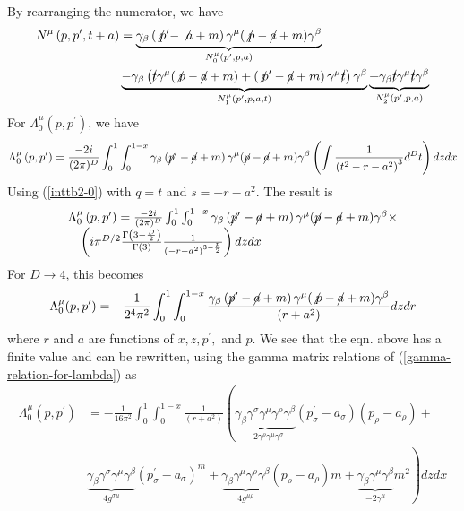 By rearranging the numerator, we have
$$
\begin{aligned}
N^{\mu}\left(p, p^{\prime}, t+a\right) &=\underbrace{\gamma_{\beta}\left(\not p^{\prime}-\not a+m\right) \gamma^{\mu}(\not p-\cancel{a}+m) \gamma^{\beta}}_{N_{0}^{\mu}\left(p^{\prime}, p, a\right)}\\
&\underbrace{-\gamma_{\beta}\left(\cancel{t} \gamma^{\mu}(\not p-\cancel{a}+m)+\left(\not p^{\prime}-\cancel{a}+m\right) \gamma^{\mu} \cancel{t}\right) \gamma^{\beta}}_{N_1^{\mu}\left(p^{\prime}, p, a, t\right)}\underbrace{+\gamma_{\beta} \cancel{t} \gamma^{\mu} \cancel{t} \gamma^{\beta}}_{N_{2}^{\mu}\left(p^{\prime}, p, a\right)}
\end{aligned}
$$
For $\Lambda_0^{\mu}(p,p^{\prime})$, we have
$$\Lambda_{0}^{\mu}\left(p, p^{\prime}\right)=\frac{-2 i}{(2 \pi)^{D}} \int_{0}^{1} \int_{0}^{1-x} \gamma_{\beta}\left(\cancel{p}^{\prime}-\cancel{a}+m\right) \gamma^{\mu}(\cancel{p}-\cancel{a}+m) \gamma^{\beta}\left(\int \frac{1}{\left(t^{2}-r-a^{2}\right)^{3}} d^{D} t\right) d z d x$$
Using (\ref{inttb2-0}) with $q=t$ and $s=-r-a^2$. The result is
$$\begin{array}{l}
\Lambda_{0}^{\mu}\left(p, p^{\prime}\right)=\frac{-2 i}{(2 \pi)^{D}} \int_{0}^{1} \int_{0}^{1-x} \gamma_{\beta}\left(\cancel{p}^{\prime}-\cancel{a}+m\right) \gamma^{\mu}(\cancel{p}-\cancel{a}+m) \gamma^{\beta} \times \\
\quad\left(i \pi^{D / 2} \frac{\Gamma\left(3-\frac{D}{2}\right)}{\Gamma(3)} \frac{1}{\left(-r-a^{2}\right)^{3-\frac{p}{2}}}\right) d z d x
\end{array}$$
For $D\rightarrow4$, this becomes
\begin{equation}
\Lambda_0^{\mu}(p,p^{\prime})=-\frac{1}{2^{4} \pi^{2}} \int_{0}^{1} \int_{0}^{1-x} \frac{\gamma_{\beta}\left(\cancel{p}^{\prime}-\cancel{a}+m\right) \gamma^{\mu}(\not p-\cancel{a}+m) \gamma^{\beta}}{\left(r+a^{2}\right)} d z d r\end{equation}
where $r$ and $a$ are functions of $x, z, p^{\prime},$ and $p .$ We see that the eqn. above has a finite value and can be rewritten, using the gamma matrix relations of (\ref{gamma-relation-for-lambda}) as
\begin{equation}
\begin{aligned}
\Lambda_{0}^{\mu}\left(p, p^{\prime}\right)&=-\frac{1}{16 \pi^{2}} \int_{0}^{1} \int_{0}^{1-x} \frac{1}{\left(r+a^{2}\right)}\left(\underbrace{\gamma_{\beta} \gamma^{\sigma} \gamma^{\mu} \gamma^{\rho} \gamma^{\beta}}_{-2 \gamma^{\rho} \gamma^{\mu} \gamma^{\sigma}}\left(p_{\sigma}^{\prime}-a_{\sigma}\right)\left(p_{\rho}-a_{\rho}\right)+\right.\\
&\left.\underbrace{\gamma_{\beta} \gamma^{\sigma} \gamma^{\mu} \gamma^{\beta}}_{4 g^{\sigma \mu}}\left(p_{\sigma}^{\prime}-a_{\sigma}\right)^{m}+\underbrace{\gamma_{\beta} \gamma^{\mu} \gamma^{\rho} \gamma^{\beta}}_{4 g^{\mu\rho}}\left(p_{\rho}-a_{\rho}\right)m+\underbrace{\gamma_{\beta} \gamma^{\mu} \gamma^{\beta}}_{-2\gamma^{\mu}} m^{2}\right)dzdx
\end{aligned}
\end{equation}

